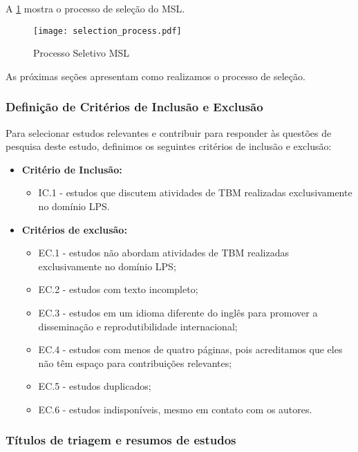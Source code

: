 A \ref{fig:selection_process} mostra o processo de seleção do MSL.

\begin{figure} [!h]
	\centering
	\texttt{[image: selection\_process.pdf]}
	\caption{Processo Seletivo MSL}
	\label{fig:selection_process}
\end{figure}

As próximas seções apresentam como realizamos o processo de seleção.

\subsubsection{Definição de Critérios de Inclusão e Exclusão}
\label{sec:criteria}

Para selecionar estudos relevantes e contribuir para responder às questões de pesquisa deste estudo, definimos os seguintes critérios de inclusão e exclusão:

\begin{itemize}
	\item \textbf{Critério de Inclusão:}
	\begin{itemize}
		\item IC.1 - estudos que discutem atividades de TBM realizadas exclusivamente no domínio LPS.
	\end{itemize}
	
	\item \textbf{Critérios de exclusão:}
	\begin{itemize}
		\item EC.1 - estudos não abordam atividades de TBM realizadas exclusivamente no domínio LPS;
		\item EC.2 - estudos com texto incompleto;
		\item EC.3 - estudos em um idioma diferente do inglês para promover a disseminação e reprodutibilidade internacional;
		\item EC.4 - estudos com menos de quatro páginas, pois acreditamos que eles não têm espaço para contribuições relevantes;
		\item EC.5 - estudos duplicados;
		\item EC.6 - estudos indisponíveis, mesmo em contato com os autores.
	\end{itemize}
\end{itemize}

\subsubsection{Títulos de triagem e resumos de estudos}

